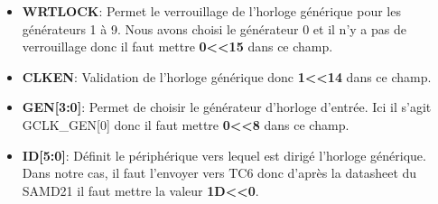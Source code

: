 \documentclass[a4paper]{article}
\begin{document}
	\begin{itemize}
		\item {\bf WRTLOCK}: Permet le verrouillage de l’horloge générique pour les générateurs 1 à 9. Nous avons choisi le générateur 0 et il n’y a pas de verrouillage donc il faut mettre {\bf 0\textless\textless15} dans ce champ.~~\\
		\item {\bf CLKEN}: Validation de l’horloge générique donc {\bf 1\textless\textless14} dans ce champ.~~\\
		\item {\bf GEN[3:0]}: Permet de choisir le générateur d’horloge d’entrée. Ici il s’agit GCLK\_GEN[0] donc il faut mettre {\bf 0\textless\textless8} dans ce champ.~~\\
		\item {\bf ID[5:0]}: Définit le périphérique vers lequel est dirigé l’horloge générique. Dans notre cas, il faut l’envoyer vers TC6 donc d’après la datasheet du SAMD21 il faut mettre la valeur {\bf 1D\textless\textless0}.~~\\
	\end{itemize}
	
\end{document}
